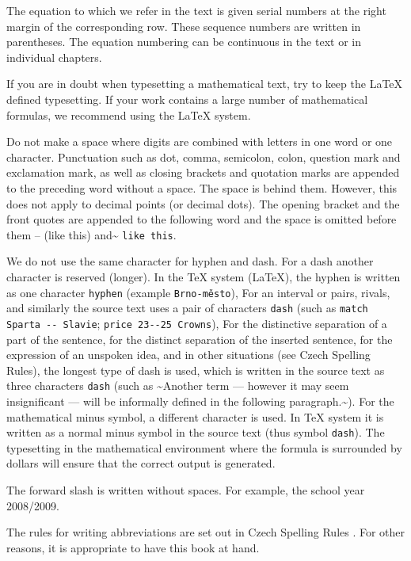 \documentclass[english,odsaz]{fitthesis}
\begin{document}
The equation to which we refer in the text is given serial numbers at the right
margin of the corresponding row. These sequence numbers are written in
parentheses. The equation numbering can be continuous in the text or in
individual chapters.

If you are in doubt when typesetting a mathematical text, try to keep the \LaTeX{}
defined typesetting. If your work contains a large number of mathematical
formulas, we recommend using the \LaTeX{} system.

Do not make a space where digits are combined with letters in one word or one
character.  Punctuation such as dot, comma, semicolon, colon, question mark and
exclamation mark, as well as closing brackets and quotation marks are appended
to the preceding word without a space. The space is behind them. However, this
does not apply to decimal points (or decimal dots). The opening bracket and the
front quotes are appended to the following word and the space is omitted before
them -- (like this) and\textasciitilde{} \verb~like this~.

We do not use the same character for hyphen and dash. For a dash another
character is reserved (longer). In the \TeX{} system (\LaTeX{}), the hyphen is written
as one character \verb~hyphen~ (example \verb~Brno-město~), For an interval or
pairs, rivals, and similarly the source text uses a pair of characters \verb~dash~
(such as \verb~match Sparta -- Slavie~; \verb~price 23--25 Crowns~), For the
distinctive separation of a part of the sentence, for the distinct separation of
the inserted sentence, for the expression of an unspoken idea, and in other
situations (see Czech Spelling Rules), the longest type of dash is used, which
is written in the source text as three characters \verb~dash~ (such as \textasciitilde{}Another
term --- however it may seem insignificant --- will be informally defined in the
following paragraph.\textasciitilde{}). For the mathematical minus symbol, a different character
is used. In \TeX{} system it is written as a normal minus symbol in the source text
(thus symbol \verb~dash~). The typesetting in the mathematical environment where
the formula is surrounded by dollars will ensure that the correct output is
generated.

The forward slash is written without spaces. For example, the school year
2008/2009.

The rules for writing abbreviations are set out in Czech Spelling Rules
\cite{Pravidla}. For other reasons, it is appropriate to have this book at hand.
\end{document}
